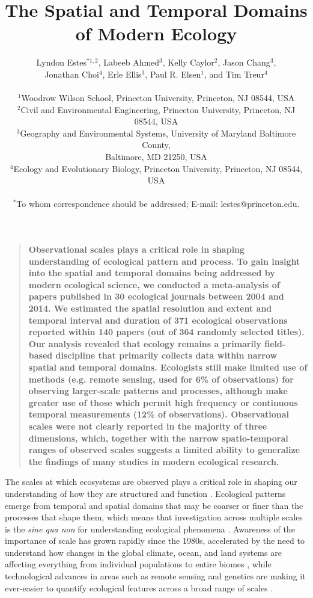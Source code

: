 \documentclass[12pt]{article}
\title{The Spatial and Temporal Domains of Modern Ecology }%
\author
{Lyndon Estes$^{\ast1, 2}$, Labeeb Ahmed$^{3}$, Kelly Caylor$^{2}$, Jason Chang$^{3}$, \\
Jonathan Choi$^{4}$, Erle Ellis$^{3}$, Paul R. Elsen$^{1}$, and Tim Treur$^{4}$ \\
\\
\normalsize{$^{1}$Woodrow Wilson School, Princeton University, Princeton, NJ 08544, USA}\\
\normalsize{$^{2}$Civil and Environmental Engineering, Princeton University, Princeton, NJ 08544, USA}\\
\normalsize{$^{3}$Geography and Environmental Systems, University of Maryland Baltimore County,}\\
\normalsize{Baltimore, MD 21250, USA}\\
\normalsize{$^{4}$Ecology and Evolutionary Biology, Princeton University, Princeton, NJ 08544, USA}\\
\\
\normalsize{$^\ast$To whom correspondence should be addressed; E-mail:  lestes@princeton.edu.}
}
\date{}
\newenvironment{sciabstract}{%
\begin{quote} \bf}
{\end{quote}}
\begin{document}
 


\baselineskip24pt


\maketitle 




\begin{sciabstract}
Observational scales plays a critical role in shaping understanding of ecological pattern and process. To gain insight into the spatial and temporal domains being addressed by modern ecological science, we conducted a meta-analysis of papers published in 30 ecological journals between 2004 and 2014. We estimated the spatial resolution and extent and temporal interval and duration of 371 ecological observations reported within 140 papers (out of 364 randomly selected titles). Our analysis revealed that ecology remains a primarily field-based discipline that primarily collects data within narrow spatial and temporal domains. Ecologists still make limited use of methods (e.g. remote sensing, used for 6\% of observations) for observing larger-scale patterns and processes, although make greater use of those which permit high frequency or continuous temporal measurements (12\% of observations). Observational scales were not clearly reported in the majority of three dimensions, which, together with the narrow spatio-temporal ranges of observed scales suggests a limited ability to generalize the findings of many studies in modern ecological research.    

\end{sciabstract}

\linenumbers
The scales at which ecosystems are observed plays a critical role in shaping our understanding of how they are structured and function \cite{levin_problem_1992,chave_problem_2013,wiens_spatial_1989-1}.  Ecological patterns emerge from temporal and spatial domains that may be coarser or finer than the processes that shape them, which means that investigation across multiple scales is the \emph{sine qua non} for understanding ecological phenomena \cite{levin_problem_1992}. Awareness of the importance of scale has grown rapidly since the 1980s, accelerated by the need to understand how changes in the global climate, ocean, and land systems are affecting everything from individual populations \cite{tingley_push_2012} to entire biomes \cite{xiao_photosynthetic_2004}, while technological advances in areas such as remote sensing and genetics are making it ever-easier to quantify ecological features across a broad range of scales \cite{schneider_rise_2001,chave_problem_2013}.  
\end{document}
